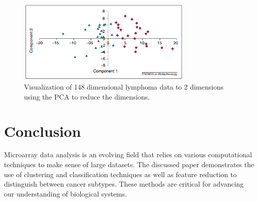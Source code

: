 \documentclass{llncs}
\begin{document}
\begin{figure}
	\centering
	\includegraphics[width=0.75\textwidth]{images/148_to_2_dimensions_lymphoma.png}
	\caption{Visualization of 148 dimensional lymphoma data to 2 dimensions using the PCA to reduce the dimensions.}
	\label{fig:example1}
\end{figure}

\section{Conclusion}

Microarray data analysis is an evolving field that relies on various computational
techniques to make sense of large datasets. The discussed paper demonstrates
the use of clustering and classification techniques as well as feature reduction
to distinguish between cancer subtypes.
These methods are critical for advancing our understanding of biological systems.
\end{document}
